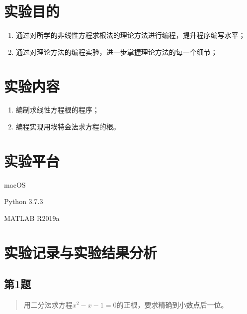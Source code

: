 






\newcommand{\ThisProjectTitle}{非线性方程求根}
\newcommand{\ThisDate}{2017年12月25日}
\newcommand{\ThisNo}{No.6}






\section{实验目的}
\begin{enumerate}[leftmargin=1.4cm, itemsep=-0.5mm]
    \item 通过对所学的非线性方程求根法的理论方法进行编程，提升程序编写水平；
    \item 通过对理论方法的编程实验，进一步掌握理论方法的每一个细节；
\end{enumerate}

\section{实验内容}
\begin{enumerate}[leftmargin=1.4cm, itemsep=-0.5mm]
    \item 编制求线性方程根的程序；
    \item 编程实现用埃特金法求方程的根。
\end{enumerate}

\section{实验平台}

macOS

Python 3.7.3

MATLAB R2019a

\section{实验记录与实验结果分析}

\subsection{第1题}
\begin{quote}
    {\kaishu
        用二分法求方程$x^2-x-1=0$的正根，要求精确到小数点后一位。\cite{RN731}
    }
\end{quote}

